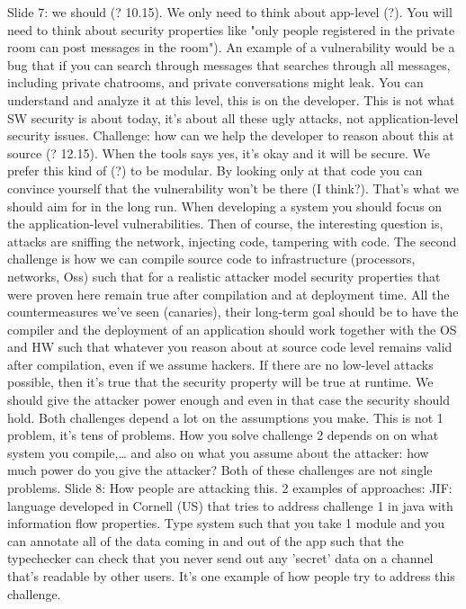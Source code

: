 \documentclass[10pt,a4paper]{report}
\begin{document}
Slide 7: we should (? 10.15). We only need to think about app-level  (?). You will need to think about security properties like "only people registered in the private room can post messages in the room"). An example of a vulnerability would be a bug that if you can search through messages that searches through all messages, including private chatrooms, and private conversations might leak. You can understand and analyze it at this level, this is on the developer. This is not what SW security is about today, it's about all these ugly attacks, not application-level security issues.
Challenge: how can we help the developer to reason about this at source (? 12.15).
When the tools says yes, it's okay and it will be secure. 
We prefer this kind of (?) to be modular. By looking only at that code you can convince yourself that the vulnerability won't be there (I think?). That's what we should aim for in the long run. When developing a system you should focus on the application-level vulnerabilities.
Then of course, the interesting question is, attacks are sniffing the network, injecting code, tampering with code. The second challenge is how we can compile source code to infrastructure (processors, networks, Oss) such that for a realistic attacker model security properties that were proven here remain true after compilation and at deployment time. All the countermeasures we've seen (canaries), their long-term goal should be to have the compiler and the deployment of an application should work together with the OS and HW such that whatever you reason about at source code level remains valid after compilation, even if we assume hackers.
If there are no low-level attacks possible, then it's true that the security property will be true at runtime. We should give the attacker power enough and even in that case the security should hold.
Both challenges depend a lot on the assumptions you make. This is not 1 problem, it's tens of problems. How you solve challenge 2 depends on on what system you compile,… and also on what you assume about the attacker: how much power do you give the attacker? Both of these challenges are not single problems.
Slide 8: How people are attacking this. 2 examples of approaches: JIF: language developed in Cornell (US) that tries to address challenge 1 in java with information flow properties. Type system such that you take 1 module and you can annotate all of the data coming in and out of the app such that the typechecker can check that you never send out any 'secret' data on a channel that's readable by other users. It's one example of how people try to address this challenge.
\end{document}
